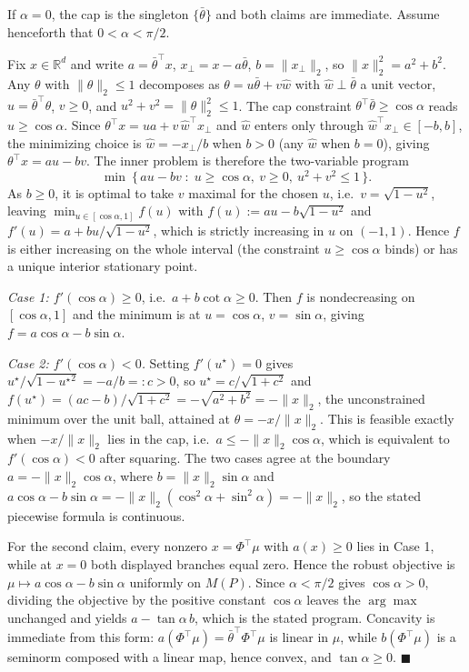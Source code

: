 \documentclass{article}
\begin{document}
If $\alpha=0$, the cap is the singleton $\{\bar\theta\}$ and both claims are
immediate. Assume henceforth that $0<\alpha<\pi/2$.

Fix $x \in \mathbb{R}^d$ and write $a = \bar\theta^\top x$, $x_\perp = x -
a\bar\theta$, $b = \|x_\perp\|_2$, so $\|x\|_2^2 = a^2+b^2$. Any
$\theta$ with $\|\theta\|_2\le1$ decomposes as $\theta = u\bar\theta + v\hat
w$ with $\hat w \perp \bar\theta$ a unit vector, $u = \bar\theta^\top\theta$,
$v \geq 0$, and $u^2+v^2 = \|\theta\|_2^2 \le 1$. The cap constraint
$\theta^\top\bar\theta \ge \cos\alpha$ reads $u \ge \cos\alpha$. Since
$\theta^\top x = ua + v\,\hat w^\top x_\perp$ and $\hat w$ enters only through
$\hat w^\top x_\perp \in [-b, b]$, the minimizing choice is $\hat w =
-x_\perp/b$ when $b>0$ (any $\hat w$ when $b=0$), giving $\theta^\top x = au -
bv$. The inner problem is therefore the two-variable program
\[
\min\ \{\,au - bv \;:\; u \ge \cos\alpha,\ v\ge0,\ u^2+v^2\le1\,\}.
\]
As $b \ge 0$, it is optimal to take $v$ maximal for the chosen $u$, i.e.\
$v = \sqrt{1-u^2}$, leaving $\min_{u\in[\cos\alpha,1]} f(u)$ with $f(u) := au -
b\sqrt{1-u^2}$ and $f'(u) = a + bu/\sqrt{1-u^2}$, which is strictly increasing
in $u$ on $(-1,1)$. Hence $f$ is either increasing on the whole interval (the
constraint $u \ge \cos\alpha$ binds) or has a unique interior stationary point.

\emph{Case 1: $f'(\cos\alpha) \ge 0$}, i.e.\ $a + b\cot\alpha \ge 0$. Then $f$
is nondecreasing on $[\cos\alpha,1]$ and the minimum is at $u = \cos\alpha$,
$v = \sin\alpha$, giving $f = a\cos\alpha - b\sin\alpha$.

\emph{Case 2: $f'(\cos\alpha) < 0$.} Setting $f'(u^\star)=0$ gives
$u^\star/\sqrt{1-{u^\star}^2} = -a/b =: c > 0$, so $u^\star = c/\sqrt{1+c^2}$
and $f(u^\star) = (ac-b)/\sqrt{1+c^2} = -\sqrt{a^2+b^2} = -\|x\|_2$, the
unconstrained minimum over the unit ball, attained at $\theta = -x/\|x\|_2$.
This is feasible exactly when $-x/\|x\|_2$ lies in the cap, i.e.\ $a \le
-\|x\|_2\cos\alpha$, which is equivalent to $f'(\cos\alpha)<0$ after squaring.
The two cases agree at the boundary $a = -\|x\|_2\cos\alpha$, where $b =
\|x\|_2\sin\alpha$ and $a\cos\alpha - b\sin\alpha = -\|x\|_2(\cos^2\alpha +
\sin^2\alpha) = -\|x\|_2$, so the stated piecewise formula is continuous.

For the second claim, every nonzero $x=\Phi^\top\mu$ with $a(x)\ge0$ lies in
Case 1, while at $x=0$ both displayed branches equal zero. Hence the robust objective is
$\mu\mapsto a\cos\alpha - b\sin\alpha$ uniformly on $M(P)$. Since $\alpha <
\pi/2$ gives $\cos\alpha>0$, dividing the objective by the positive constant
$\cos\alpha$ leaves the $\arg\max$ unchanged and yields $a - \tan\alpha\, b$,
which is the stated program. Concavity is immediate from this form:
$a(\Phi^\top\mu) = \bar\theta^\top\Phi^\top\mu$ is linear in $\mu$, while
$b(\Phi^\top\mu)$ is a seminorm composed with a linear map, hence convex, and
$\tan\alpha \ge 0$. $\blacksquare$
\end{document}

